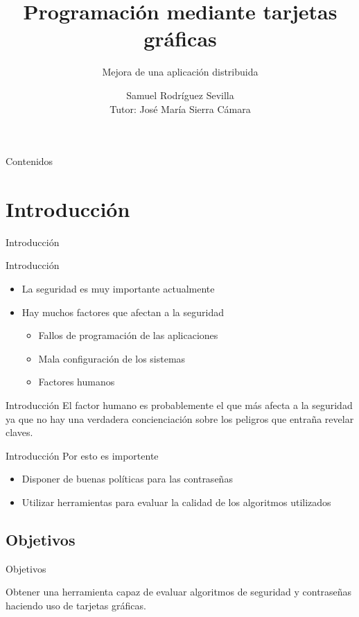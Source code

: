 \documentclass[12pt]{beamer}
\title{Programación mediante tarjetas gráficas}
\subtitle{Mejora de una aplicación distribuida}
\author{Samuel Rodríguez Sevilla\\Tutor: José María Sierra Cámara}
\newcommand{\mysection}[1]{\begin{frame}{}\begin{center}\Huge #1\end{center}\end{frame}}
\begin{document}
\frame{\titlepage}



\begin{frame}{Contenidos}
	\tableofcontents[pausesections]
\end{frame}

\section{Introducción}
\mysection{Introducción}
\begin{frame}{Introducción}
	\begin{itemize}
		\item La seguridad es muy importante actualmente
		\item Hay muchos factores que afectan a la seguridad
		\begin{itemize}
			\item Fallos de programación de las aplicaciones
			\item Mala configuración de los sistemas
			\item Factores humanos
		\end{itemize}
	\end{itemize}
\end{frame}

\begin{frame}{Introducción}
	El factor humano es probablemente el que más afecta a la seguridad ya que no hay una verdadera concienciación sobre los peligros que entraña revelar claves.

\end{frame}

\begin{frame}{Introducción}
	Por esto es importente
	\pause
	\begin{itemize}
		\item Disponer de buenas políticas para las contraseñas
		\item Utilizar herramientas para evaluar la calidad de los algoritmos utilizados
	\end{itemize}
\end{frame}

\subsection{Objetivos}
\begin{frame}{Objetivos}
	\begin{center}
		Obtener una herramienta capaz de evaluar algoritmos de seguridad y contraseñas haciendo uso de tarjetas gráficas.
	\end{center}
\end{frame}
\end{document}
